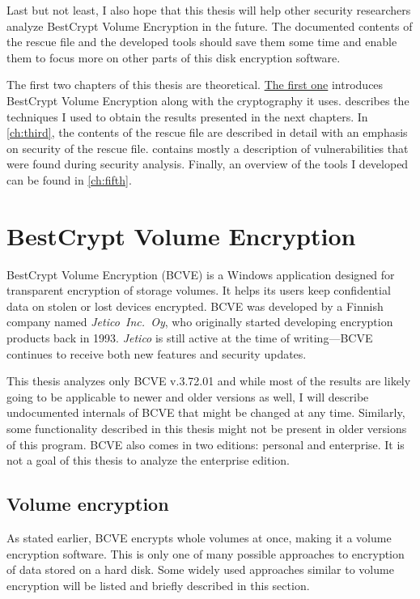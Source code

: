 \documentclass[thesis=B,english]{FITthesis}[2012/10/20]
\begin{document}
	Last but not least, I also hope that this thesis will help other security researchers analyze 
	BestCrypt Volume Encryption in the future. The documented contents of the rescue file and the developed tools should save them some time and enable them to focus more on other parts of this disk encryption software.
	
	The first two chapters of this thesis are theoretical. \hyperref[ch:first]{The first one} introduces BestCrypt Volume Encryption along with the cryptography it uses.  describes the techniques I used to obtain the results presented in the next chapters. In \cref{ch:third}, the contents of the rescue file are described in detail with an emphasis on security of the rescue file.  contains mostly a description of vulnerabilities that were found during security analysis. Finally, an overview of the tools I developed can be found in \cref{ch:fifth}.
	
	\chapter{BestCrypt Volume Encryption}
	\label{ch:first}
	
	BestCrypt Volume Encryption (BCVE) is a Windows application designed for transparent encryption of storage volumes. It helps its users keep confidential data on stolen or lost devices encrypted. BCVE was developed by a Finnish company named \textit{Jetico~Inc.~Oy}, who originally started developing encryption products back in 1993. \textit{Jetico} is still active at the time of writing---BCVE continues to receive both new features and security updates. 
	
	This thesis analyzes only BCVE v.3.72.01 and while most of the results are likely going to be applicable to newer and older versions as well, I will describe undocumented internals of BCVE that might be changed at any time. Similarly, some functionality described in this thesis might not be present in older versions of this program. BCVE also comes in two editions: personal and enterprise. It is not a goal of this thesis to analyze the enterprise edition.
	
	\section{Volume encryption}
	As stated earlier, BCVE encrypts whole volumes at once, making it a volume encryption software. This is only one of many possible approaches to encryption of data stored on a hard disk. Some widely used approaches similar to volume encryption will be listed and briefly described in this section. 
	
\end{document}
